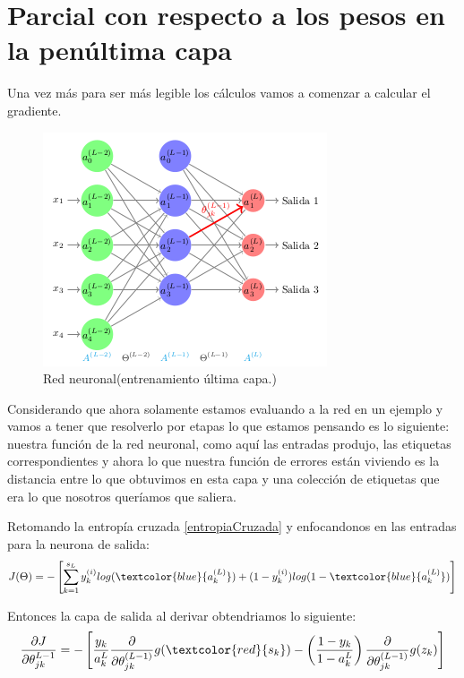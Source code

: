 \section{Parcial con respecto a los pesos en la penúltima capa}


Una vez más para ser más legible los cálculos vamos a comenzar a calcular el gradiente.

\begin{figure}[H]
 \centering
 \includegraphics[scale=0.7]{../Figuras/AredNa.png}
 \caption{Red neuronal(entrenamiento última capa.)}
 \label{fig:graficaLog}
\end{figure}

Considerando que ahora solamente estamos evaluando a la red en un ejemplo y vamos a tener que resolverlo por etapas lo que estamos pensando es lo siguiente: nuestra función de la red neuronal, como aquí las entradas produjo, las etiquetas correspondientes y ahora lo que nuestra función de errores están viviendo es la distancia entre lo que obtuvimos en esta capa y una colección de etiquetas que era lo que nosotros queríamos que saliera. 


Retomando la entropía cruzada \ref{entropiaCruzada} y enfocandonos en las entradas para la neurona de salida:
 \begin{equation}
  J (\Theta) = -\left[\sum_{k=1}^{s_{L}}y_{k}^{(i)} log(\textcolor{blue}{a_{k}^{(L)}}) + (1-y_{k}^{(i)}) log(1 - \textcolor{blue} {a_{k}^{(L)}})  \right] 
  \label{eq:EntropiaCruz}
 \end{equation}
 
 Entonces la capa de salida al derivar obtendriamos lo siguiente:
 \begin{equation}
  \dfrac{\partial J}{\partial \theta_{jk}^{L-1}} = - \left[ \dfrac{y_{k}}{a_{k}^{L}} \dfrac{\partial}{\partial\theta_{jk}^{(L-1)}} g(\textcolor{red}{s_{k}}) - \left(\dfrac{1 - y_{k}}{1 - a_{k}^{L}} \right) \dfrac{\partial}{\partial \theta_{jk}^{(L-1)}}g(z_{k})\right]
 \end{equation}
 

